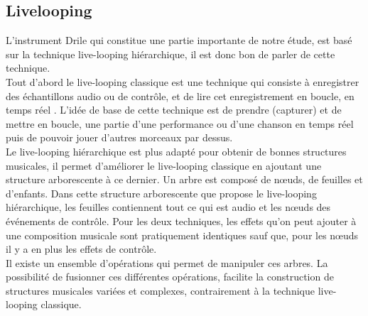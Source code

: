 \subsection{Livelooping}
L'instrument Drile qui constitue une partie importante de notre étude, est basé sur la technique live-looping hiérarchique, il est donc bon de parler de cette technique.\\
Tout d'abord le live-looping classique est une technique qui consiste à enregistrer des échantillons audio ou de contrôle, et de lire cet enregistrement en boucle, en temps réel . L'idée de base de cette technique est de prendre (capturer) et de mettre en boucle, une partie d'une performance ou d'une chanson en temps réel puis de pouvoir jouer d'autres morceaux par dessus. \\
Le live-looping hiérarchique est plus adapté pour obtenir de bonnes structures musicales, il permet d'améliorer le live-looping classique en ajoutant une structure arborescente à ce dernier. Un arbre est composé de nœuds, de feuilles et d’enfants. Dans cette structure arborescente que propose le live-looping hiérarchique, les feuilles contiennent tout ce qui est audio et les nœuds des événements de contrôle. Pour les deux techniques, les effets qu'on peut ajouter à une composition musicale sont pratiquement identiques sauf que, pour les nœuds il y a en plus les effets de contrôle.\\
Il existe un ensemble d'opérations qui permet de manipuler ces arbres. La possibilité de fusionner ces différentes opérations, facilite la construction de structures musicales variées et complexes, contrairement à la technique live-looping classique.\\


